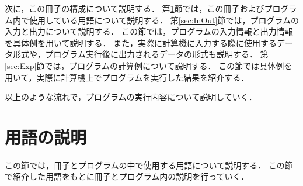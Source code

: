 \documentclass[11pt,titlepage,dvipdfmx,twoside]{jarticle}
\begin{document}
\begin{itemize}
% 

\end{itemize}

次に，この冊子の構成について説明する．
第\ref{sec:Pre}節では，この冊子およびプログラム内で使用している用語について説明する．
第\ref{sec:InOut}節では，プログラムの入力と出力について説明する．
この節では，プログラムの入力情報と出力情報を具体例を用いて説明する．
また，実際に計算機に入力する際に使用するデータ形式や，プログラム実行後に出力されるデータの形式も説明する．
第\ref{sec:Exp}節では，プログラムの計算例について説明する．
この節では具体例を用いて，実際に計算機上でプログラムを実行した結果を紹介する．

以上のような流れで，プログラムの実行内容について説明していく．


\section{用語の説明}
\label{sec:Pre}
この節では，冊子とプログラムの中で使用する用語について説明する．
この節で紹介した用語をもとに冊子とプログラム内の説明を行っていく．
\end{document}
